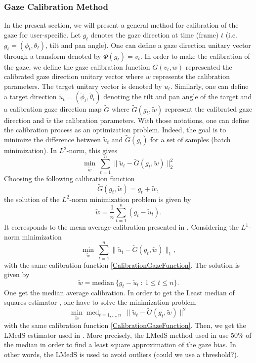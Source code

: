 \documentclass[11pt,a4paper]{article}
\DeclareMathOperator*{\med}{med}
\begin{document}
\subsubsection{Gaze Calibration Method}
In the present section, we will present a general method for calibration of the gaze for user-specific. Let $g_t$ denotes the gaze direction at time (frame) $t$ (i.e. $g_t=(\phi_t,\theta_t)$, tilt and pan angle). One can define a gaze direction unitary vector through a transform denoted by $\Phi(g_t) = v_t$. In order to make the calibration of the gaze, we define the gaze calibration function $G(v_t,w)$ represented the calibrated gaze direction unitary vector where $w$ represents the calibration parameters. The target unitary vector is denoted by $u_t$. Similarly, one can define a target direction $\tilde{u}_t =(\tilde{\phi}_t,\tilde{\theta}_t)$ denoting the tilt and pan angle of the target and a calibration gaze direction map $\tilde{G}$ where $\tilde{G}(g_t,\tilde{w})$ represent the calibrated gaze direction and $\tilde{w}$ the calibration parameters. With those notations, one can define the calibration process as an optimization problem. Indeed, the goal is to minimize the difference between $\tilde{u}_t$ and $\tilde{G}(g_t)$ for a set of samples (batch minimization). In $L^2$-norm, this gives
\begin{equation}
\min_{\tilde{w}} ~\sum_{t=1}^n \|\tilde{u}_t - \tilde{G}(g_t,\tilde{w}) \|_2^2
\end{equation}
Choosing the following calibration function
\begin{equation}
\label{CalibrationGazeFunction}
\tilde{G}(g_t,\tilde{w}) = g_t+\tilde{w}, 
\end{equation}
the solution of the $L^2$-norm minimization problem is given by
\begin{equation}
\tilde{w} = \frac{1}{n}\sum_{t=1}^n ( g_t - \tilde{u}_t) .
\end{equation}
It corresponds to the mean average calibration presented in \cite{Siegfried2017}. Considering the $L^1$-norm minimization
\begin{equation}
\min_{\tilde{w}} ~\sum_{t=1}^n \|\tilde{u}_t - \tilde{G}(g_t,\tilde{w}) \|_1,
\end{equation}
with the same calibration function \eqref{CalibrationGazeFunction}. The solution is given by 
\begin{equation}
\tilde{w} = \text{median}~\{g_t-\tilde{u}_t~:~1 \leq t \leq n \}.
\end{equation}
One get the median average calibration. In order to get the Least median of squares estimator \cite{LMedS1984}, one have to solve the minimization problem
\begin{equation}
\min_{\tilde{w}} \med_{t=1,...,n} ~ \| \tilde{u}_t - \tilde{G}(g_t,\tilde{w}) \|^2
\end{equation}
with the same calibration function \eqref{CalibrationGazeFunction}. Then, we get the LMedS estimator used in \cite{Siegfried2017}. More precisely, the LMedS method used in \cite{Siegfried2017} use 50\% of the median in order to find a least square approximation of the gaze bias. In other words, the LMedS is used to avoid outliers (could we use a threshold?).
\end{document}
